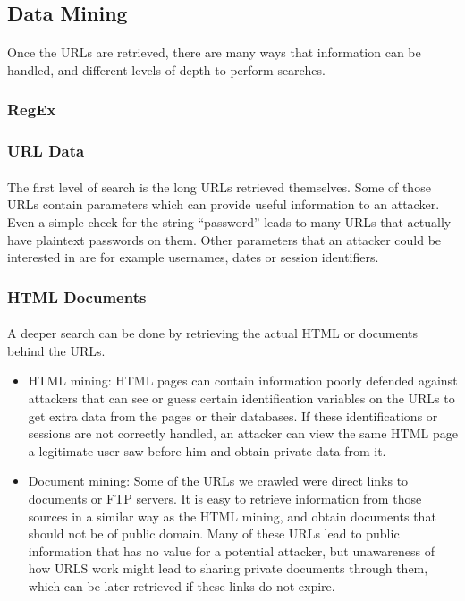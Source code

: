 \documentclass[12pt]{article}
\begin{document}
\subsection{Data Mining}

\paragraph{}
Once the URLs are retrieved, there are many ways that information can be handled, and different levels of depth to perform searches.

\subsubsection{RegEx}

\subsubsection{URL Data}

\paragraph{}
The first level of search is the long URLs retrieved themselves. Some of those URLs contain parameters which can provide useful information to an attacker. Even a simple check for the string “password” leads to many URLs that actually have plaintext passwords on them. Other parameters that an attacker could be interested in are for example usernames, dates or session identifiers.

\subsubsection{HTML Documents}

\paragraph{}
A deeper search can be done by retrieving the actual HTML or documents behind the URLs.

\begin{itemize}

\item  HTML mining: HTML pages can contain information poorly defended against attackers that can see or guess certain identification variables on the URLs to get extra data from the pages or their databases. If these identifications or sessions are not correctly handled, an attacker can view the same HTML page a legitimate user saw before him and obtain private data from it.

\item  Document mining: Some of the URLs we crawled were direct links to documents or FTP servers. It is easy to retrieve information from those sources in a similar way as the HTML mining, and obtain documents that should not be of public domain. Many of these URLs lead to public information that has no value for a potential attacker, but unawareness of how URLS work might lead to sharing private documents through them, which can be later retrieved if these links do not expire.

\end{itemize}
\end{document}
